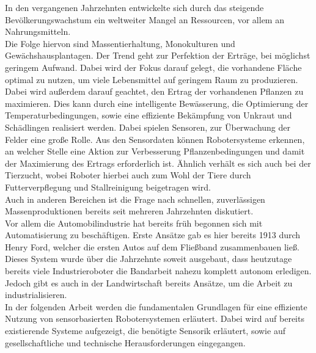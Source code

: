 In den vergangenen Jahrzehnten entwickelte sich durch das steigende
Bevölkerungswachstum ein weltweiter Mangel an Ressourcen, vor allem an
Nahrungsmitteln.\\Die Folge
hiervon sind Massentierhaltung, Monokulturen und Gewächshausplantagen. Der
Trend geht zur Perfektion der Erträge, bei möglichst geringem Aufwand. Dabei
wird der Fokus darauf gelegt, die vorhandene Fläche optimal zu nutzen, um viele
Lebensmittel auf geringem Raum zu produzieren. Dabei wird außerdem darauf
geachtet, den Ertrag der vorhandenen Pflanzen zu maximieren. Dies kann durch
eine intelligente Bewässerung, die Optimierung der Temperaturbedingungen, sowie
eine effiziente Bekämpfung von Unkraut und Schädlingen realisiert werden. Dabei
spielen Sensoren, zur Überwachung der Felder eine große Rolle. Aus den
Sensordaten können Robotersysteme erkennen, an welcher Stelle eine Aktion zur
Verbesserung Pflanzenbedingungen und damit der Maximierung des Ertrags
erforderlich ist. Ähnlich verhält es sich auch bei der Tierzucht, wobei Roboter
hierbei auch zum Wohl der Tiere durch Futterverpflegung und Stallreinigung
beigetragen wird. \\Auch in anderen Bereichen ist die Frage nach schnellen,
zuverlässigen Massenproduktionen bereits seit mehreren Jahrzehnten diskutiert.
\\Vor allem die Automobilindustrie hat bereits früh begonnen sich mit
Automatisierung zu beschäftigen. Erste Ansätze gab es hier bereits 1913\cite{raff1987did} durch
Henry Ford, welcher die ersten Autos auf dem Fließband zusammenbauen ließ.
Dieses System wurde über die Jahrzehnte soweit ausgebaut, dass heutzutage
bereits viele Industrieroboter die Bandarbeit nahezu komplett autonom
erledigen. \\Jedoch gibt es auch in der Landwirtschaft bereits Ansätze, um die
Arbeit zu industrialisieren. \\In der folgenden Arbeit werden die fundamentalen
Grundlagen für eine effiziente Nutzung von sensorbasierten Robotersystemen
erläutert. Dabei wird auf bereits existierende Systeme aufgezeigt, die
benötigte Sensorik erläutert, sowie auf gesellschaftliche und technische
Herausforderungen eingegangen.